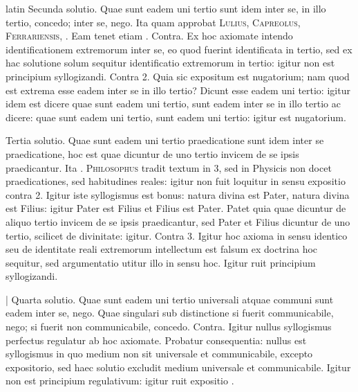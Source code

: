 \begin{otherlanguage*}{latin}
\pstart
Secunda solutio. Quae sunt eadem uni tertio sunt idem inter se, in illo tertio, concedo; inter se, nego. Ita  quam approbat \textsc{Lulius}, \textsc{Capreolus}, \textsc{Ferrariensis}, . Eam tenet etiam . Contra. Ex hoc axiomate intendo identificationem extremorum inter se, eo quod fuerint identificata in tertio, sed ex hac solutione solum sequitur identificatio extremorum in tertio:
igitur non est principium syllogizandi. Contra 2. Quia sic expositum est nugatorium; nam quod est extrema esse eadem inter se in illo tertio? Dicunt esse eadem uni tertio:
igitur idem est dicere quae sunt eadem uni tertio, sunt eadem inter se in illo tertio ac dicere:
quae sunt eadem uni tertio, sunt eadem uni tertio:
igitur est nugatorium. 
\pend

\pstart
Tertia solutio. Quae sunt eadem uni tertio praedicatione sunt idem inter se praedicatione, hoc est quae dicuntur de uno tertio invicem de se ipsis praedicantur. Ita . \textsc{Philosophus} tradit textum in  3, sed in Physicis non docet praedicationes, sed habitudines reales:
igitur non fuit loquitur in sensu expositio contra 2. Igitur iste syllogismus est bonus:
natura divina est Pater, natura divina est Filius:
igitur Pater est Filius et Filius est Pater. Patet quia quae dicuntur de aliquo tertio invicem de se ipsis praedicantur, sed Pater et Filius dicuntur de uno tertio, scilicet de divinitate:
igitur. Contra 3. Igitur hoc axioma in sensu identico seu de identitate reali extremorum intellectum est falsum ex doctrina hoc sequitur, sed argumentatio utitur illo in sensu hoc. Igitur ruit principium syllogizandi. 
\pend

\pstart
\textnormal{|} Quarta solutio. Quae sunt eadem uni tertio universali atquae communi sunt eadem inter se, nego. Quae singulari sub distinctione si fuerit communicabile, nego; si fuerit non communicabile, concedo. Contra. Igitur nullus syllogismus perfectus regulatur ab hoc axiomate. Probatur consequentia:
nullus est syllogismus in quo medium non sit universale et communicabile, excepto expositorio, sed haec solutio excludit medium universale et communicabile. Igitur non est principium regulativum:
igitur ruit expositio . 
\pend


\end{otherlanguage*}
